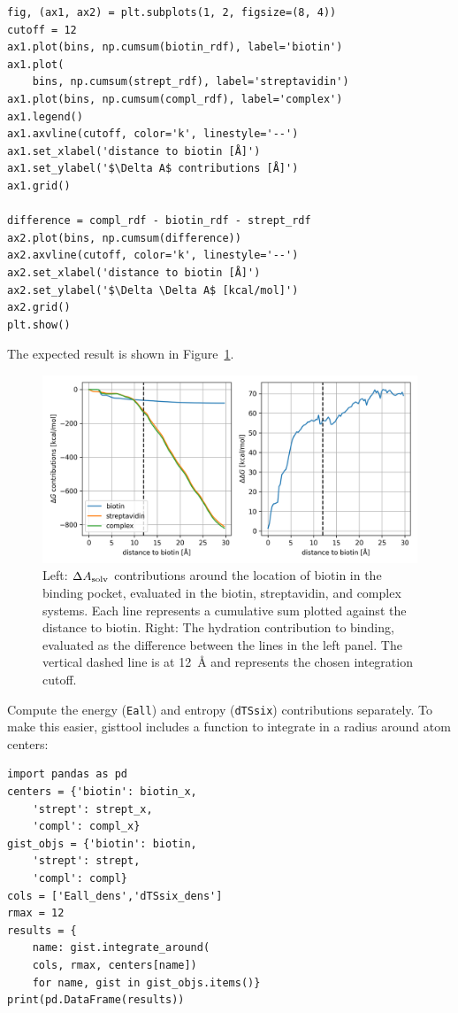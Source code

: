 \documentclass[9pt,tutorial]{livecoms}
\newcommand{\dasolv}{\Delta A_\textup{solv}}
\newcommand\inlinecode{\texttt}
\begin{document}
\begin{lstlisting}[style=python]
fig, (ax1, ax2) = plt.subplots(1, 2, figsize=(8, 4))
cutoff = 12
ax1.plot(bins, np.cumsum(biotin_rdf), label='biotin')
ax1.plot(
    bins, np.cumsum(strept_rdf), label='streptavidin')
ax1.plot(bins, np.cumsum(compl_rdf), label='complex')
ax1.legend()
ax1.axvline(cutoff, color='k', linestyle='--')
ax1.set_xlabel('distance to biotin [Å]')
ax1.set_ylabel('$\Delta A$ contributions [Å]')
ax1.grid()

difference = compl_rdf - biotin_rdf - strept_rdf
ax2.plot(bins, np.cumsum(difference))
ax2.axvline(cutoff, color='k', linestyle='--')
ax2.set_xlabel('distance to biotin [Å]')
ax2.set_ylabel('$\Delta \Delta A$ [kcal/mol]')
ax2.grid()
plt.show()
\end{lstlisting}
The expected result is shown in Figure~\ref{fig-dg-sums}.
\begin{figure}[H]
	\centering
	\includegraphics[width=1.0\linewidth]{figures/deltaG-difference.png}
	\caption{Left: $\dasolv$ contributions around the location of biotin in the binding pocket, evaluated in the biotin, streptavidin, and complex systems. Each line represents a cumulative sum plotted against the distance to biotin. Right: The hydration contribution to binding, evaluated as the difference between the lines in the left panel. The vertical dashed line is at \SI{12}{\angstrom} and represents the chosen integration cutoff.}\label{fig-dg-sums}
\end{figure}
Compute the energy (\inlinecode{Eall}) and entropy (\inlinecode{dTSsix}) contributions separately.
 To make this easier, gisttool includes a function to integrate in a radius around atom centers:
\begin{lstlisting}[style=python]
import pandas as pd
centers = {'biotin': biotin_x, 
    'strept': strept_x, 
    'compl': compl_x}
gist_objs = {'biotin': biotin, 
    'strept': strept, 
    'compl': compl}
cols = ['Eall_dens','dTSsix_dens']
rmax = 12
results = {
    name: gist.integrate_around(
    cols, rmax, centers[name])
    for name, gist in gist_objs.items()}
print(pd.DataFrame(results))
\end{lstlisting}
\end{document}
